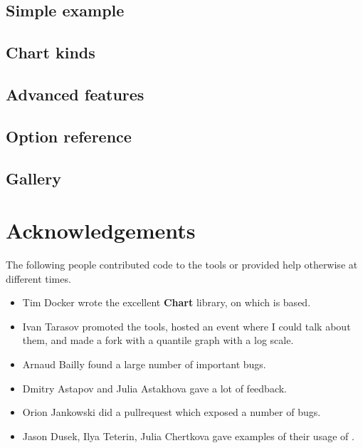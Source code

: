 \documentclass{article}
\begin{document}
\subsection{Simple example}

\subsection{Chart kinds}

\subsection{Advanced features}

\subsection{Option reference}

\subsection{Gallery}

\section{Acknowledgements}

The following people contributed code to the tools or provided help otherwise at different times.
\begin{itemize}
\item Tim Docker wrote the excellent \textbf{Chart} library, on which \timeplot{} is based.
\item Ivan Tarasov promoted the tools, hosted an event where I could talk about them, and made a fork with a quantile graph with a log scale.
\item Arnaud Bailly found a large number of important bugs.
\item Dmitry Astapov and Julia Astakhova gave a lot of feedback.
\item Orion Jankowski did a pullrequest which exposed a number of bugs.
\item Jason Dusek, Ilya Teterin, Julia Chertkova gave examples of their usage of \timeplot{}.
\end{itemize}
\end{document}
